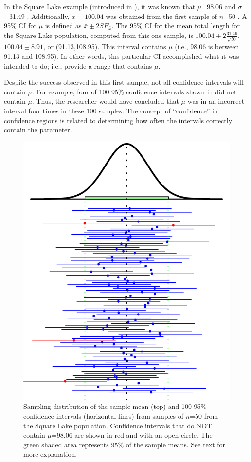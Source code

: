 \documentclass[10pt,openany]{book}\usepackage[]{graphicx}\usepackage[]{color}
\newenvironment{knitrout}{}{} %
\begin{document}
In the Square Lake example (introduced in ), it was known that $\mu$=98.06 and $\sigma$=31.49 . Additionally, $\bar{x}=100.04$ was obtained from the first sample of $n$=50 . A 95\% CI for $\mu$ is defined as $\bar{x}\pm2SE_{\bar{x}}$. The 95\% CI for the mean total length for the Square Lake population, computed from this one sample, is $100.04\pm2\frac{31.49}{\sqrt{50}}$, $100.04\pm8.91$, or (91.13,108.95). This interval contains $\mu$ (i.e., 98.06 is between 91.13 and 108.95). In other words, this particular CI accomplished what it was intended to do; i.e., provide a range that contains $\mu$.

Despite the success observed in this first sample, not all confidence intervals will contain $\mu$. For example, four of 100 95\% confidence intervals shown in  did not contain $\mu$. Thus, the researcher would have concluded that $\mu$ was in an incorrect interval four times in these 100 samples. The concept of ``confidence'' in confidence regions is related to determining how often the intervals correctly contain the parameter.

\begin{knitrout}
\color{fgcolor}\begin{figure}[hbtp]

{\centering \includegraphics[width=.5\linewidth]{Figs/CIex100-1} 

}

\caption[Sampling distribution of the sample mean (top) and 100 95\% confidence intervals (horizontal lines) from samples of $n$=50 from the Square Lake population]{Sampling distribution of the sample mean (top) and 100 95\% confidence intervals (horizontal lines) from samples of $n$=50 from the Square Lake population. Confidence intervals that do NOT contain $\mu$=98.06 are shown in red and with an open circle. The green shaded area represents 95\% of the sample means. See text for more explanation.}\label{fig:CIex100}
\end{figure}


\end{knitrout}
\end{document}
